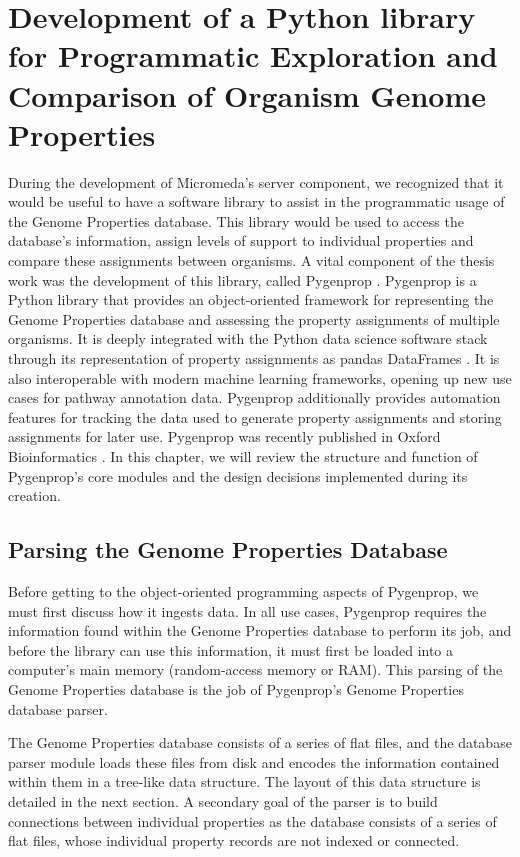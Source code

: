 \chapter{Development of a Python library for Programmatic Exploration and Comparison of Organism Genome Properties} \label{Pygenprop}

During the development of Micromeda's server component, we recognized that it would be useful to have a software library to assist in the programmatic usage of the Genome Properties database. This library would be used to access the database's information, assign levels of support to individual properties and compare these assignments between organisms. A vital component of the thesis work was the development of this library, called Pygenprop \cite{bergstrand2019pygenprop}. Pygenprop is a Python library that provides an object-oriented framework \cite{booch1986object} for representing the Genome Properties database and assessing the property assignments of multiple organisms. It is deeply integrated with the Python data science software stack \cite{scipystack} through its representation of property assignments as pandas DataFrames  \cite{mckinney2010data}. It is also interoperable with modern machine learning frameworks, opening up new use cases for pathway annotation data. Pygenprop additionally provides automation features for tracking the data used to generate property assignments and storing assignments for later use. Pygenprop was recently published in Oxford Bioinformatics \cite{bergstrand2019pygenprop}. In this chapter, we will review the structure and function of Pygenprop's core modules and the design decisions implemented during its creation.

\section{Parsing the Genome Properties Database}

Before getting to the object-oriented programming aspects of Pygenprop, we must first discuss how it ingests data. In all use cases, Pygenprop requires the information found within the Genome Properties database to perform its job, and before the library can use this information, it must first be loaded into a computer's main memory (random-access memory or RAM). This parsing of the Genome Properties database is the job of Pygenprop's Genome Properties database parser.

The Genome Properties database consists of a series of flat files, and the database parser module loads these files from disk and encodes the information contained within them in a tree-like data structure. The layout of this data structure is detailed in the next section. A secondary goal of the parser is to build connections between individual properties as the database consists of a series of flat files, whose individual property records are not indexed or connected. 

